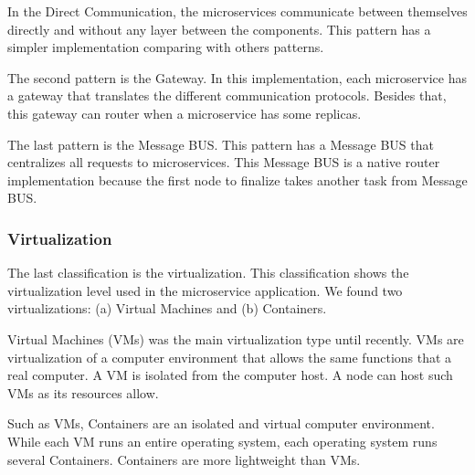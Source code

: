 In the Direct Communication, the microservices communicate between themselves directly and without any layer between the components. This pattern has a simpler implementation comparing with others patterns.

The second pattern is the Gateway. In this implementation, each microservice has a gateway that translates the different communication protocols. Besides that, this gateway can router when a microservice has some replicas.

The last pattern is the Message BUS. This pattern has a Message BUS that centralizes all requests to microservices. This Message BUS is a native router implementation because the first node to finalize takes another task from Message BUS.  

\subsubsection{Virtualization}
The last classification is the virtualization. This classification shows the virtualization level used in the microservice application. We found two virtualizations: (a) Virtual Machines and (b) Containers.

Virtual Machines (VMs) was the main virtualization type until recently. VMs are virtualization of a computer environment that allows the same functions that a real computer. A VM is isolated from the computer host. A node can host such VMs as its resources allow.

Such as VMs, Containers are an isolated and virtual computer environment. While each VM runs an entire operating system, each operating system runs several Containers. Containers are more lightweight than VMs.
